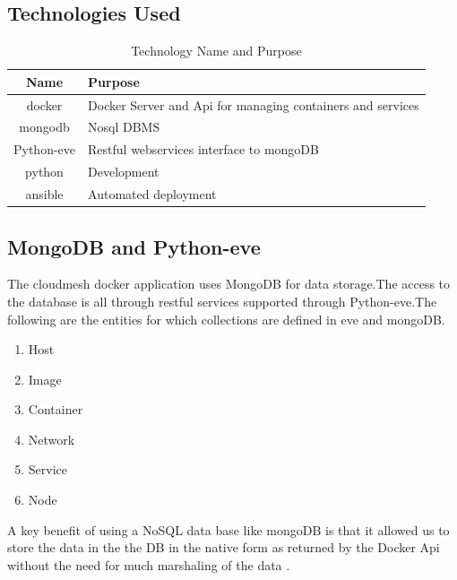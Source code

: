 \documentclass[9pt,twocolumn,twoside]{../../styles/osajnl}
\begin{document}
\subsection{Technologies Used}
\begin{table}[H]
\centering
\begin{tabular}{|cp{3cm}|} 
 \hline
 Name & Purpose \\ 
 \hline
 docker \cite{www-Docker} & Docker Server and Api for managing containers and services \\ 
 mongodb \cite{www-MongoDB} & Nosql DBMS \\ 
 Python-eve    \cite{www-Pythoneve} & Restful webservices interface to mongoDB \\ 
 python \cite{www-Python} & Development  \\ 
 ansible \cite{www-Ansible} & Automated deployment \\ [1ex] 
\hline
\end{tabular}
\caption{Technology Name and Purpose}
\label{table:1}
\end{table}

\subsection{MongoDB and Python-eve}

The cloudmesh docker application uses MongoDB\cite{www-MongoDB} for data storage.The access to the database is all through
restful services supported through Python-eve\cite{www-Pythoneve}.The following are the entities for which collections are defined 
in eve and mongoDB.

\begin{enumerate}
\item Host
\item Image
\item Container
\item Network
\item Service
\item Node
\end{enumerate}
A key benefit of using a NoSQL data base like mongoDB is that it allowed us to store the data in the the DB in the native form as returned by the Docker Api without the need for much marshaling of the data .
\end{document}
